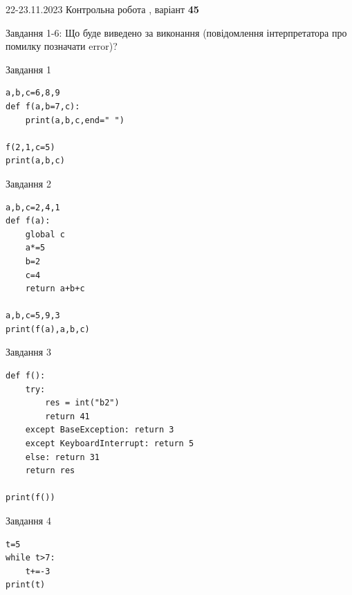 \documentclass[12pt, ukrainian]{article}
\begin{document}
{{22-23.11.2023 Контрольна робота , варіант  \No \textbf { 45 }\par}}
{

Завдання 1-6: Що буде виведено за виконання (повідомлення інтерпретатора про помилку позначати error)?


\begin{minipage}[t]{9.7cm}                
{\begin{center}Завдання {1}\end{center}}
\begin{verbatim}
a,b,c=6,8,9
def f(a,b=7,c):
    print(a,b,c,end=" ")

f(2,1,c=5)
print(a,b,c)
\end{verbatim}     
\end{minipage}
\vline \hspace{8mm}
\begin{minipage}[t]{8.0cm}                
{\begin{center}Завдання {2}\end{center}}
\begin{verbatim}
a,b,c=2,4,1
def f(a):
    global c
    a*=5
    b=2
    c=4
    return a+b+c

a,b,c=5,9,3
print(f(a),a,b,c)
\end{verbatim}     
\end{minipage}

\vspace{15mm}
\begin{minipage}[t]{9.7cm}                
{\begin{center}Завдання {3}\end{center}}
\begin{verbatim}
def f():
    try:
        res = int("b2")
        return 41
    except BaseException: return 3
    except KeyboardInterrupt: return 5
    else: return 31
    return res

print(f())
\end{verbatim}     
\end{minipage}
\vline \hspace{8mm}
\begin{minipage}[t]{8.0cm}                
{\begin{center}Завдання {4}\end{center}}
\begin{verbatim}
t=5
while t>7:
    t+=-3
print(t)
\end{verbatim}     
\end{minipage}

}
\end{document}
